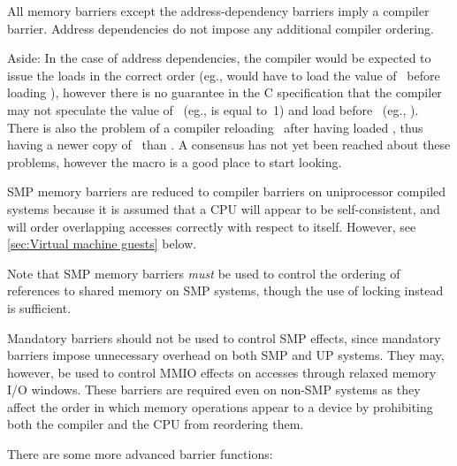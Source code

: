 All memory barriers except the address-dependency barriers imply a compiler
barrier.
Address dependencies do not impose any additional compiler ordering.

Aside:
In the case of address dependencies, the compiler would be expected
to issue the loads in the correct order (eg.,  would have to load
the value of~ before loading ), however there is no guarantee in
the C specification that the compiler may not speculate the value of~
(eg., is equal to~1) and load  before~ (eg.,
).
There is also the problem of a compiler reloading~ after having loaded
, thus having a newer copy of~ than .
A consensus has not yet been reached about these problems, however the
 macro is a good place to start looking.

SMP memory barriers are reduced to compiler barriers on uniprocessor compiled
systems because it is assumed that a CPU will appear to be self-consistent,
and will order overlapping accesses correctly with respect to itself.
However, see \cref{sec:Virtual machine guests} below.

\begin{Note}
Note that SMP memory barriers \emph{must} be used to control the ordering of
references to shared memory on SMP systems, though the use of locking instead
is sufficient.
\end{Note}

Mandatory barriers should not be used to control SMP effects, since mandatory
barriers impose unnecessary overhead on both SMP and UP systems.
They may, however, be used to control MMIO effects on accesses through
relaxed memory I/O windows.
These barriers are required even on non-SMP systems as they affect the order
in which memory operations appear to a device by prohibiting both the
compiler and the CPU from reordering them.


There are some more advanced barrier functions:

